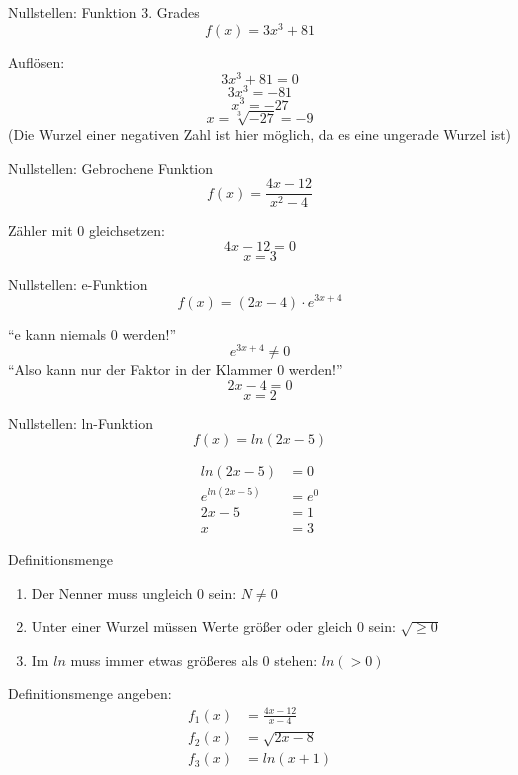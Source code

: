 \documentclass[paper=a6,landscape,ngerman,twoside=true,fontsize=12pt]{scrartcl}
\begin{document}
\begin{frage}
	Nullstellen: Funktion 3. Grades
	\[
	f(x)=3x^3+81
	\]
\end{frage}
\begin{antwort}
	Auflösen:
		\[3x^3+81=0\]
		\[3x^3=-81\]
		\[x^3=-27\]
		\[x=\sqrt[3]{-27}=-9\]
		\normalsize
		(Die Wurzel einer negativen Zahl ist hier möglich, da es eine ungerade Wurzel ist)
\end{antwort}
\begin{frage}
	Nullstellen: Gebrochene Funktion
	\[
	f(x)=\frac{4x-12}{x^2-4}
	\]
\end{frage}
\begin{antwort}
	Zähler mit 0 gleichsetzen:
	\[
	4x-12=0
	\]
	\[
	x=3
	\]
\end{antwort}
\begin{frage}
	Nullstellen: e-Funktion
	\[
	f(x)=(2x-4)\cdot{e^{3x+4}}
	\]
\end{frage}
\begin{antwort}
	"`e kann niemals 0 werden!"'
	\[
	{e^{3x+4}}\neq0
	\]
	"`Also kann nur der Faktor in der Klammer 0 werden!"'
	\[
	2x-4=0
	\]
	\[
	x=2
	\]
\end{antwort}
\begin{frage}
	Nullstellen: ln-Funktion
	\[
	f(x)=ln(2x-5)
	\]
\end{frage}
\begin{antwort}
	\begin{align*}
		ln(2x-5)&=0\\
		{e^{ln(2x-5)}}&=e^0\\
		2x-5&=1\\
		x&=3
	\end{align*}

\end{antwort}
\begin{frage}
	Definitionsmenge
\end{frage}
\begin{antwort}
	\begin{enumerate}
		\item Der Nenner muss ungleich 0 sein: $N \neq 0$
		\item Unter einer Wurzel müssen Werte größer oder gleich 0 sein: $\sqrt{\ge 0}$
		\item Im $ln$ muss immer etwas größeres als 0 stehen: $ln(>0)$\
	\end{enumerate}
\end{antwort}
\begin{frage}
	Definitionsmenge angeben:
	\begin{align*}
	     f_1(x)&=\frac{4x-12}{x-4} \\
		 f_2(x)&=\sqrt{2x-8}\\
		 f_3(x)&=ln(x+1)\\
	\end{align*}
\end{frage}
\end{document}
